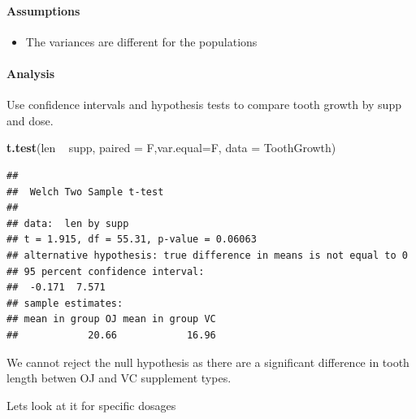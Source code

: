 \documentclass[]{article}
\newenvironment{Shaded}{\begin{snugshade}}{\end{snugshade}}
\newcommand{\KeywordTok}[1]{\textcolor[rgb]{0.13,0.29,0.53}{\textbf{{#1}}}}
\newcommand{\DataTypeTok}[1]{\textcolor[rgb]{0.13,0.29,0.53}{{#1}}}
\newcommand{\StringTok}[1]{\textcolor[rgb]{0.31,0.60,0.02}{{#1}}}
\newcommand{\NormalTok}[1]{{#1}}
\begin{document}
\paragraph{Assumptions}\label{assumptions}

\begin{itemize}
\itemsep1pt\parskip0pt
\item
  The variances are different for the populations
\end{itemize}

\paragraph{Analysis}\label{analysis}

Use confidence intervals and hypothesis tests to compare tooth growth by
supp and dose.

\begin{Shaded}
\begin{Highlighting}[]
\KeywordTok{t.test}\NormalTok{(len ~}\StringTok{ }\NormalTok{supp, }\DataTypeTok{paired =} \NormalTok{F,}\DataTypeTok{var.equal=}\NormalTok{F, }\DataTypeTok{data =} \NormalTok{ToothGrowth)}
\end{Highlighting}
\end{Shaded}

\begin{verbatim}
## 
##  Welch Two Sample t-test
## 
## data:  len by supp
## t = 1.915, df = 55.31, p-value = 0.06063
## alternative hypothesis: true difference in means is not equal to 0
## 95 percent confidence interval:
##  -0.171  7.571
## sample estimates:
## mean in group OJ mean in group VC 
##            20.66            16.96
\end{verbatim}

We cannot reject the null hypothesis as there are a significant
difference in tooth length betwen OJ and VC supplement types.

Lets look at it for specific dosages
\end{document}
